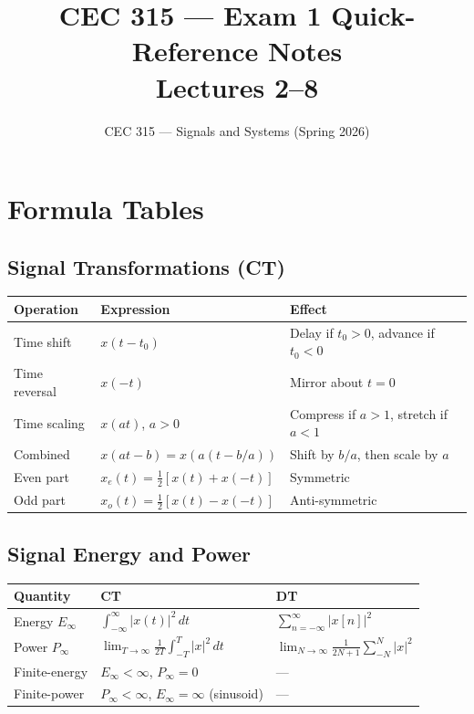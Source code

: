 \documentclass[11pt]{article}
\title{CEC 315 --- Exam 1 Quick-Reference Notes\\\large Lectures 2--8}
\author{CEC 315 --- Signals and Systems (Spring 2026)}
\date{}
\begin{document}
\maketitle
\tableofcontents
\newpage

\section{Formula Tables}

\subsection{Signal Transformations (CT)}
\begin{center}
\begin{tabular}{|l|l|l|}
\hline
Operation & Expression & Effect\\
\hline
Time shift & $x(t-t_0)$ & Delay if $t_0>0$, advance if $t_0<0$\\
Time reversal & $x(-t)$ & Mirror about $t=0$\\
Time scaling & $x(at)$, $a>0$ & Compress if $a>1$, stretch if $a<1$\\
Combined & $x(at-b) = x(a(t-b/a))$ & Shift by $b/a$, then scale by $a$\\
Even part & $x_e(t) = \tfrac12[x(t)+x(-t)]$ & Symmetric\\
Odd part & $x_o(t) = \tfrac12[x(t)-x(-t)]$ & Anti-symmetric\\
\hline
\end{tabular}
\end{center}

\subsection{Signal Energy and Power}
\begin{center}
\begin{tabular}{|l|l|l|}
\hline
Quantity & CT & DT\\
\hline
Energy $E_\infty$ & $\int_{-\infty}^{\infty}|x(t)|^2\,dt$ & $\sum_{n=-\infty}^{\infty}|x[n]|^2$\\
Power $P_\infty$ & $\lim_{T\to\infty}\tfrac{1}{2T}\int_{-T}^T|x|^2\,dt$ & $\lim_{N\to\infty}\tfrac{1}{2N+1}\sum_{-N}^{N}|x|^2$\\
Finite-energy & $E_\infty<\infty$, $P_\infty=0$ & ---\\
Finite-power & $P_\infty<\infty$, $E_\infty=\infty$ (sinusoid) & ---\\
\hline
\end{tabular}
\end{center}
\end{document}
